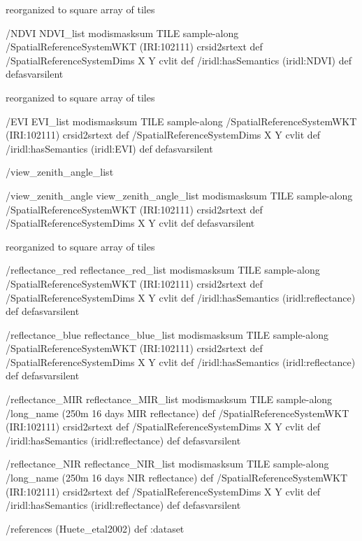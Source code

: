 reorganized to square array of tiles
\begin{ingrid}
/NDVI
{NDVI_list
   modismasksum TILE sample-along
/SpatialReferenceSystemWKT (IRI:102111) crsid2srtext def
/SpatialReferenceSystemDims { X Y } cvlit  def
/iridl:hasSemantics (iridl:NDVI) def
} defasvarsilent
\end{ingrid}
reorganized to square array of tiles
\begin{ingrid}
/EVI
{EVI_list
   modismasksum TILE sample-along
/SpatialReferenceSystemWKT (IRI:102111) crsid2srtext def
/SpatialReferenceSystemDims { X Y } cvlit def
/iridl:hasSemantics (iridl:EVI) def
} defasvarsilent
\end{ingrid}
/view_zenith_angle_list
\begin{ingrid}
/view_zenith_angle
{view_zenith_angle_list
   modismasksum TILE sample-along
/SpatialReferenceSystemWKT (IRI:102111) crsid2srtext def
/SpatialReferenceSystemDims { X Y } cvlit def
} defasvarsilent
\end{ingrid}
reorganized to square array of tiles
\begin{ingrid}
/reflectance_red
{reflectance_red_list
  modismasksum TILE sample-along
/SpatialReferenceSystemWKT (IRI:102111) crsid2srtext def
/SpatialReferenceSystemDims { X Y } cvlit def
/iridl:hasSemantics (iridl:reflectance) def
} defasvarsilent
\end{ingrid}
\begin{ingrid}
/reflectance_blue
{reflectance_blue_list
  modismasksum TILE sample-along
/SpatialReferenceSystemWKT (IRI:102111) crsid2srtext def
/SpatialReferenceSystemDims { X Y } cvlit def
/iridl:hasSemantics (iridl:reflectance) def
} defasvarsilent
\end{ingrid}
\begin{ingrid}
/reflectance_MIR
{reflectance_MIR_list
  modismasksum TILE sample-along
 /long_name (250m 16 days MIR reflectance) def
/SpatialReferenceSystemWKT (IRI:102111) crsid2srtext def
/SpatialReferenceSystemDims { X Y } cvlit def
/iridl:hasSemantics (iridl:reflectance) def
} defasvarsilent
\end{ingrid}
\begin{ingrid}
/reflectance_NIR
{reflectance_NIR_list
  modismasksum TILE sample-along
 /long_name (250m 16 days NIR reflectance) def
/SpatialReferenceSystemWKT (IRI:102111) crsid2srtext def
/SpatialReferenceSystemDims { X Y } cvlit def
/iridl:hasSemantics (iridl:reflectance) def
} defasvarsilent
\end{ingrid}
\begin{ingrid}
/references (Huete_etal2002) def
:dataset
\end{ingrid}


